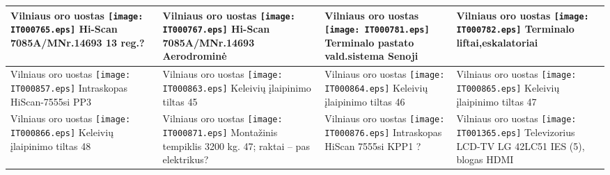 \documentclass[a4paper,12pt]{article}
\begin{document}
\begin{supertabular}{|p{4.2cm}|p{4.2cm}|p{4.2cm}|p{4.2cm}|}
Vilniaus oro uostas \newline \texttt{[image: IT000765.eps]} \newline Hi-Scan 7085A/MNr.14693 \newline \footnotesize {13 reg.?} & Vilniaus oro uostas \newline \texttt{[image: IT000767.eps]} \newline Hi-Scan 7085A/MNr.14693 \newline \footnotesize {Aerodrominė} & Vilniaus oro uostas \newline \texttt{[image: IT000781.eps]} \newline Terminalo pastato vald.sistema \newline \footnotesize {Senoji} & Vilniaus oro uostas \newline \texttt{[image: IT000782.eps]} \newline Terminalo liftai,eskalatoriai \newline \footnotesize {}\\\hline
Vilniaus oro uostas \newline \texttt{[image: IT000857.eps]} \newline Intraskopas HiScan-7555si \newline \footnotesize {PP3} & Vilniaus oro uostas \newline \texttt{[image: IT000863.eps]} \newline Keleivių įlaipinimo tiltas \newline \footnotesize {45
} & Vilniaus oro uostas \newline \texttt{[image: IT000864.eps]} \newline Keleivių įlaipinimo tiltas \newline \footnotesize {46} & Vilniaus oro uostas \newline \texttt{[image: IT000865.eps]} \newline Keleivių įlaipinimo tiltas \newline \footnotesize {47}\\\hline
Vilniaus oro uostas \newline \texttt{[image: IT000866.eps]} \newline Keleivių įlaipinimo tiltas \newline \footnotesize {48} & Vilniaus oro uostas \newline \texttt{[image: IT000871.eps]} \newline Montažinis tempiklis 3200 kg. \newline \footnotesize {47; raktai – pas elektrikus?} & Vilniaus oro uostas \newline \texttt{[image: IT000876.eps]} \newline Intraskopas HiScan 7555si \newline \footnotesize {KPP1 ?} & Vilniaus oro uostas \newline \texttt{[image: IT001365.eps]} \newline Televizorius LCD-TV LG 42LC51 \newline \footnotesize {IES (5), blogas HDMI}\\\hline

\end{supertabular}
\end{document}
